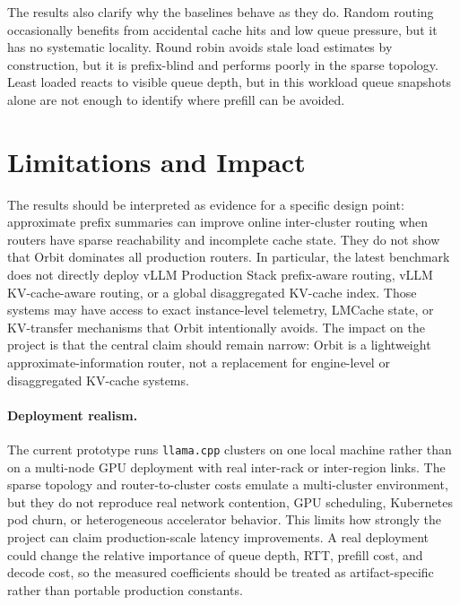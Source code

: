 \documentclass[10pt,twocolumn]{article}
\begin{document}
The results also clarify why the baselines behave as they do. Random routing occasionally benefits from accidental cache hits and low queue pressure, but it has no systematic locality. Round robin avoids stale load estimates by construction, but it is prefix-blind and performs poorly in the sparse topology. Least loaded reacts to visible queue depth, but in this workload queue snapshots alone are not enough to identify where prefill can be avoided.

\section{Limitations and Impact}

The results should be interpreted as evidence for a specific design point: approximate prefix summaries can improve online inter-cluster routing when routers have sparse reachability and incomplete cache state. They do not show that Orbit dominates all production routers. In particular, the latest benchmark does not directly deploy vLLM Production Stack prefix-aware routing, vLLM KV-cache-aware routing, or a global disaggregated KV-cache index. Those systems may have access to exact instance-level telemetry, LMCache state, or KV-transfer mechanisms that Orbit intentionally avoids. The impact on the project is that the central claim should remain narrow: Orbit is a lightweight approximate-information router, not a replacement for engine-level or disaggregated KV-cache systems.

\paragraph{Deployment realism.}
The current prototype runs \texttt{llama.cpp} clusters on one local machine rather than on a multi-node GPU deployment with real inter-rack or inter-region links. The sparse topology and router-to-cluster costs emulate a multi-cluster environment, but they do not reproduce real network contention, GPU scheduling, Kubernetes pod churn, or heterogeneous accelerator behavior. This limits how strongly the project can claim production-scale latency improvements. A real deployment could change the relative importance of queue depth, RTT, prefill cost, and decode cost, so the measured coefficients should be treated as artifact-specific rather than portable production constants.
\end{document}
